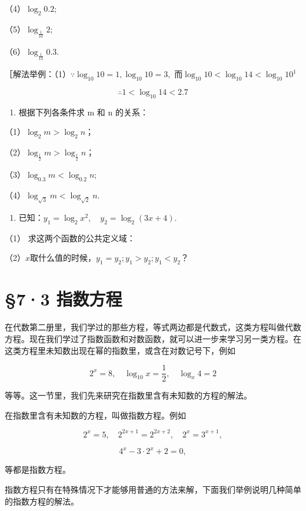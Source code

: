 （4）\(\log_{2}0.2;\)

（5）\(\log_{\frac{1}{10}}2;\)

（6）\(\log_{\frac{1}{13}}0.3.\)

［解法举例：（1）\(\because \log_{10}10 = 1, \log_{10}10 = 3,\)
而\(\log_{10}10 < \log_{10}14 < \log_{10}10^{1}\)

\[
\therefore 1 < \log_{10} 14 < 2.7
\]

\begin{enumerate}[start=6]
\item
  根据下列各条件求 m 和 n 的关系：
\end{enumerate}

（1）\(\log_2 m > \log_2 n\)；

（2）\(\log_{\frac{1}{2}} m > \log_{\frac{1}{2}} n\)；

（3）\(\log_{0.3}m < \log_{0.2}n;\)

（4）\(\log_{\sqrt{3}} m < \log_{\sqrt{2}} n.\)

\begin{enumerate}[start=7]
\item
  已知：\(y_{1}=\log_{2}x^{2},\quad y_{2}=\log_{2}(3x+4).\)
\end{enumerate}

（1） 求这两个函数的公共定义域：

（2）\(x\)取什么值的时候，\(y_{1} = y_{2}; y_{1} > y_{2}; y_{1} < y_{2}\)？

\section{§7·3 指数方程}

在代数第二册里，我们学过的那些方程，等式两边都是代数式，这类方程叫做代数方程。现在我们学过了指数函数和对数函数，就可以进一步来学习另一类方程。在这类方程里未知数出现在幂的指数里，或含在对数记号下，例如

\[
2^{x} = 8, \quad \log_{10} x = \frac{1}{2}, \quad \log_{x} 4 = 2
\]

等等。这一节里，我们先来研究在指数里含有未知数的方程的解法。

在指数里含有未知数的方程，叫做指数方程。例如

\[
2^{x} = 5, \quad 2^{2 x + 1} = 2^{2 x + 2}, \quad 2^{x} = 3^{x + 1},
\]

\[
4^{x} - 3 \cdot 2^{x} + 2 = 0,
\]

等都是指数方程。

指数方程只有在特殊情况下才能够用普通的方法来解，下面我们举例说明几种简单的指数方程的解法。

